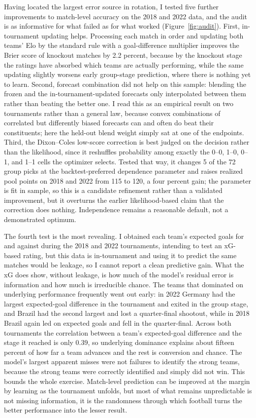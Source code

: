 \documentclass[11pt,letterpaper]{article}
\begin{document}
Having located the largest error source in rotation, I tested five further improvements to match-level accuracy on the 2018 and 2022 data, and the audit is as informative for what failed as for what worked (Figure~\ref{fig:audit}). First, in-tournament updating helps. Processing each match in order and updating both teams' Elo by the standard rule with a goal-difference multiplier improves the Brier score of knockout matches by 2.2 percent, because by the knockout stage the ratings have absorbed which teams are actually performing, while the same updating slightly worsens early group-stage prediction, where there is nothing yet to learn. Second, forecast combination did not help on this sample: blending the frozen and the in-tournament-updated forecasts only interpolated between them rather than beating the better one. I read this as an empirical result on two tournaments rather than a general law, because convex combinations of correlated but differently biased forecasts can and often do beat their constituents; here the held-out blend weight simply sat at one of the endpoints. Third, the Dixon--Coles low-score correction \citep{dixoncoles1997} is best judged on the decision rather than the likelihood, since it reshuffles probability among exactly the 0--0, 1--0, 0--1, and 1--1 cells the optimizer selects. Tested that way, it changes 5 of the 72 group picks at the backtest-preferred dependence parameter and raises realized pool points on 2018 and 2022 from 115 to 120, a four percent gain; the parameter is fit in sample, so this is a candidate refinement rather than a validated improvement, but it overturns the earlier likelihood-based claim that the correction does nothing. Independence remains a reasonable default, not a demonstrated optimum.

The fourth test is the most revealing. I obtained each team's expected goals for and against during the 2018 and 2022 tournaments, intending to test an xG-based rating, but this data is in-tournament and using it to predict the same matches would be leakage, so I cannot report a clean predictive gain. What the xG does show, without leakage, is how much of the model's residual error is information and how much is irreducible chance. The teams that dominated on underlying performance frequently went out early: in 2022 Germany had the largest expected-goal difference in the tournament and exited in the group stage, and Brazil had the second largest and lost a quarter-final shootout, while in 2018 Brazil again led on expected goals and fell in the quarter-final. Across both tournaments the correlation between a team's expected-goal difference and the stage it reached is only 0.39, so underlying dominance explains about fifteen percent of how far a team advances and the rest is conversion and chance. The model's largest apparent misses were not failures to identify the strong teams, because the strong teams were correctly identified and simply did not win. This bounds the whole exercise. Match-level prediction can be improved at the margin by learning as the tournament unfolds, but most of what remains unpredictable is not missing information, it is the randomness through which football turns the better performance into the lesser result.
\end{document}
